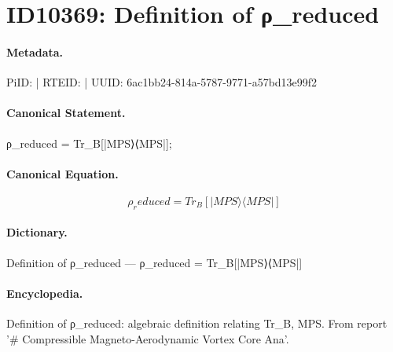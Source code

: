 \section*{ID10369: Definition of ρ\_reduced}
\paragraph{Metadata.}
PiID:  | RTEID:  | UUID: 6ac1bb24-814a-5787-9771-a57bd13e99f2

\paragraph{Canonical Statement.}
ρ\_reduced = Tr\_B[|MPS⟩⟨MPS|];

\paragraph{Canonical Equation.}
\[
ρ_reduced = Tr_B[|MPS⟩⟨MPS|]
\]

\paragraph{Dictionary.}
Definition of ρ\_reduced — ρ\_reduced = Tr\_B[|MPS⟩⟨MPS|]

\paragraph{Encyclopedia.}
Definition of ρ\_reduced: algebraic definition relating Tr\_B, MPS. From report '\# Compressible Magneto-Aerodynamic Vortex Core Ana'.
